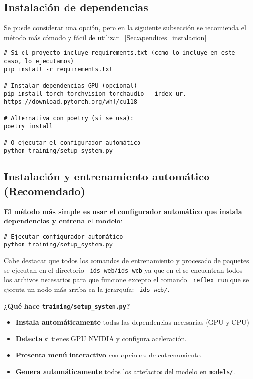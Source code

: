 \subsection*{Instalación de dependencias}
Se puede considerar una opción, pero en la siguiente subsección se recomienda el método más cómodo y fácil de utilizar ~\ref{Sec:apendices_instalacion}
\begin{lstlisting}[style=tfgbash,caption={Instalar dependencias del proyecto},label=List.InstallDeps]
# Si el proyecto incluye requirements.txt (como lo incluye en este caso, lo ejecutamos)
pip install -r requirements.txt

# Instalar dependencias GPU (opcional)
pip install torch torchvision torchaudio --index-url https://download.pytorch.org/whl/cu118

# Alternativa con poetry (si se usa):
poetry install

# O ejecutar el configurador automático
python training/setup_system.py
\end{lstlisting}

\subsection*{Instalación y entrenamiento automático (Recomendado)}\label{Sec:apendices_instalacion}
\textbf{El método más simple es usar el configurador automático que instala dependencias y entrena el modelo:}

\begin{lstlisting}[style=tfgbash,caption={Configuración completa automática},label=List.AutoSetup]
# Ejecutar configurador automático 
python training/setup_system.py
\end{lstlisting}

Cabe destacar que todos los comandos de entrenamiento y procesado de paquetes se ejecutan en el directorio ~\texttt{ids\_web/ids\_web} ya que en el se encuentran todos los archivos necesarios para que funcione excepto el comando ~\texttt{reflex run} que se ejecuta un nodo más arriba en la jerarquía: ~\texttt{ids\_web/}.

\textbf{¿Qué hace \texttt{training/setup\_system.py}?}
\begin{itemize}
  \item \textbf{Instala automáticamente} todas las dependencias necesarias (GPU y CPU)
  \item \textbf{Detecta} si tienes GPU NVIDIA y configura aceleración.
  \item \textbf{Presenta menú interactivo} con opciones de entrenamiento.
  \item \textbf{Genera automáticamente} todos los artefactos del modelo en \texttt{models/}.
\end{itemize}

